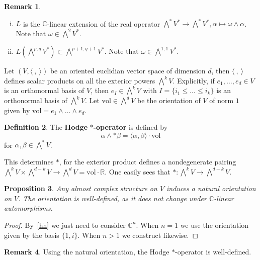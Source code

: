 \documentclass{article}
\theoremstyle{definition}
\newtheorem{definition}{Definition}[subsection]
\newtheorem{remark}[definition]{Remark}
\theoremstyle{plain}
\newtheorem{proposition}[definition]{Proposition}
\begin{document}
\begin{remark}
    \begin{enumerate}[(i)]
        \item $ L $ is the $ \mathbb{C} $-linear extension of the real operator $ \bigwedge^{*}V^{*}\rightarrow \bigwedge^{*}V^{*},\alpha\mapsto\omega\wedge\alpha $. Note that $ \omega\in\bigwedge^{2}V^{*} $.
        \item $ L(\bigwedge^{p,q}V^*)\subset\bigwedge^{p+1,q+1}V^* $. Note that $ \omega\in\bigwedge^{1,1}V^* $.
    \end{enumerate}
\end{remark}

Let $ (V,\langle\ ,\ \rangle) $ be an oriented euclidian vector space of dimension $ d $, then $ \langle\ ,\ \rangle $ defines scalar products on all the exterior powers $ \bigwedge^{k}V $. Explicitly, if $ e_1,\dots,e_d\in V $ is an orthonormal basis of $ V $, then $ e_I\in\bigwedge^k V $ with $ I=\{i_1\le\dots\le i_k
\} $ is an orthonormal basis of $ \bigwedge^k V $. Let $ \mathrm{vol}\in \bigwedge^d V $ be the orientation of $ V $ of norm $ 1 $ given by $ \mathrm{vol}=e_1\wedge\dots\wedge e_d $.\label{wds}

\begin{definition}
    The \textbf{Hodge} $ * $\textbf{-operator} is defined by\[
        \alpha\wedge *\beta=\langle\alpha,\beta\rangle\cdot\mathrm{vol}
    \]for $ \alpha,\beta\in\bigwedge^* V $.
\end{definition}

This determines $ * $, for the exterior product defines a nondegenerate pairing $ \bigwedge^k V\times \bigwedge^{d-k}V\rightarrow\bigwedge^d V=\mathrm{vol}\cdot\mathbb{R} $. One easily sees that $ *:\bigwedge^k V\rightarrow \bigwedge^{d-k}V $.

\begin{proposition}
    Any almost complex structure on $ V $ induces a natural orientation on $ V $. The orientation is well-defined, as it does not change under $ \mathbb{C} $-linear automorphisms.
\end{proposition}

\begin{proof}
    By~\ref{hh} we just need to consider $ \mathbb{C}^n $. When $ n=1 $ we use the orientation given by the basis $ \{1,i\} $. When $ n>1 $ we construct likewise.
\end{proof}

\begin{remark}
    Using the natural orientation, the Hodge $ * $-operator is well-defined.
\end{remark}
\end{document}
